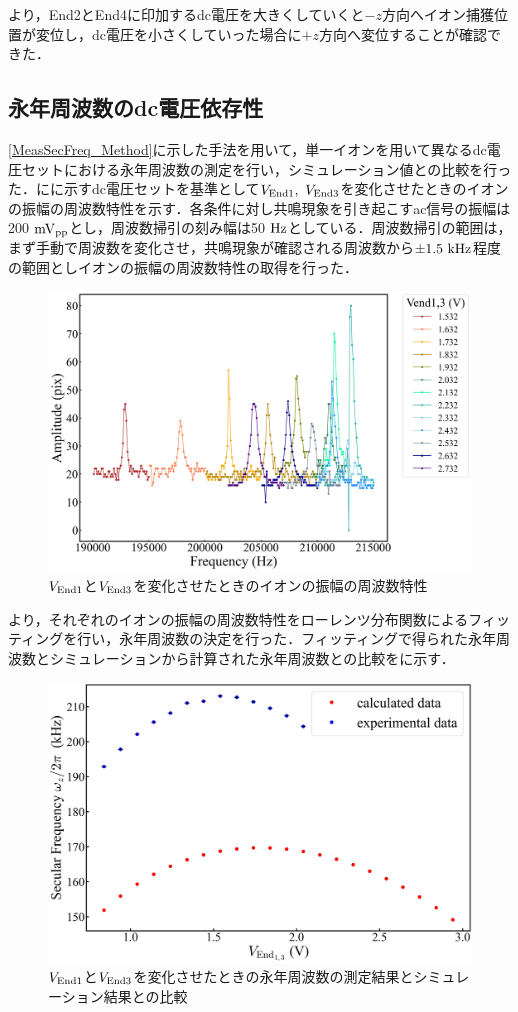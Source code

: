 より，End2とEnd4に印加するdc電圧を大きくしていくと$-z$方向へイオン捕獲位置が変位し，dc電圧を小さくしていった場合に$+z$方向へ変位することが確認できた．

\clearpage

\subsection{永年周波数のdc電圧依存性}
\ref{MeasSecFreq_Method}に示した手法を用いて，単一イオンを用いて異なるdc電圧セットにおける永年周波数の測定を行い，シミュレーション値との比較を行った．にに示すdc電圧セットを基準として$V_{\rm End1}, \ V_{\rm End3}$を変化させたときのイオンの振幅の周波数特性を示す．各条件に対し共鳴現象を引き起こすac信号の振幅は200$\ {\rm mV_{pp}}$とし，周波数掃引の刻み幅は50$\ {\rm Hz}$としている．周波数掃引の範囲は，まず手動で周波数を変化させ，共鳴現象が確認される周波数から$\pm1.5 \ {\rm kHz}$程度の範囲としイオンの振幅の周波数特性の取得を行った．

\begin{figure}[h]
	\begin{center}
		\includegraphics[width = 0.6\linewidth]{./results/figure/end13-SecFreq.jpg}
		\caption{$V_{\rm End1}$と$V_{\rm End3}$を変化させたときのイオンの振幅の周波数特性}
		\label{fig:end13_MeasSec}
	\end{center}
\end{figure}

より，それぞれのイオンの振幅の周波数特性をローレンツ分布関数によるフィッティングを行い，永年周波数の決定を行った．フィッティングで得られた永年周波数とシミュレーションから計算された永年周波数との比較をに示す．

\begin{figure}[h]
	\begin{center}
		\includegraphics[width = 0.6\linewidth]{./results/figure/Vend13-SecFreqZ.jpg}
		\caption{$V_{\rm End1}$と$V_{\rm End3}$を変化させたときの永年周波数の測定結果とシミュレーション結果との比較}
		\label{fig:end13_MeasSec_SimSec}
	\end{center}
\end{figure}

